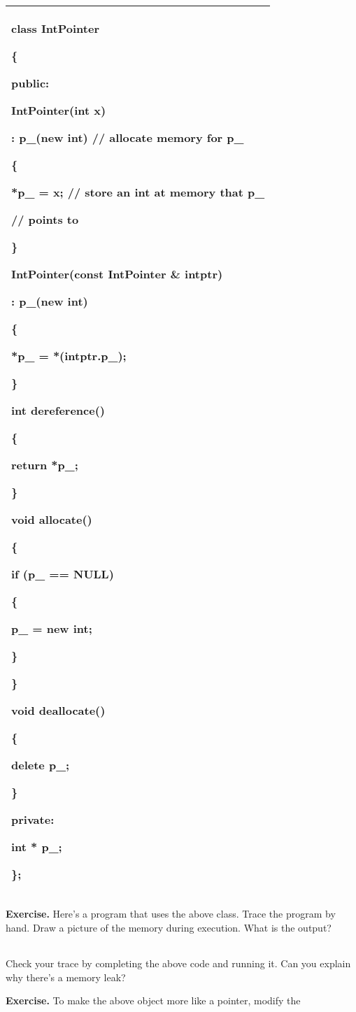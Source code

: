 \documentclass[
]{article}
\begin{document}
\begin{longtable}[]{@{}l@{}}
\toprule
\endhead
\begin{minipage}[t]{0.97\columnwidth}\raggedright
class IntPointer

\{

public:

IntPointer(int x)

: p\_(new int) // allocate memory for p\_

\{

*p\_ = x; // store an int at memory that p\_

// points to

\}

IntPointer(const IntPointer \& intptr)

: p\_(new int)

\{

*p\_ = *(intptr.p\_);

\}

int dereference()

\{

return *p\_;

\}

void allocate()

\{

if (p\_ == NULL)

\{

p\_ = new int;

\}

\}

void deallocate()

\{

delete p\_;

\}

private:

int * p\_;

\};\strut
\end{minipage}\tabularnewline
\bottomrule
\end{longtable}

\textbf{Exercise.} Here's a program that uses the above class. Trace the
program by hand. Draw a picture of the memory during execution. What is
the output?

\begin{longtable}[]{@{}@{}}
\toprule
\endhead
\bottomrule
\end{longtable}

Check your trace by completing the above code and running it. Can you
explain why there's a memory leak?

\textbf{Exercise.} To make the above object more like a pointer, modify
the
\end{document}
